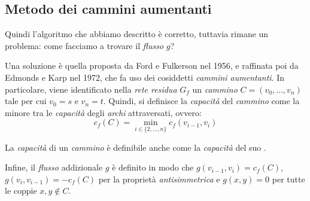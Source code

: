 \subsection{Metodo dei cammini aumentanti}
Quindi l'algoritmo che abbiamo descritto è corretto, tuttavia rimane un problema:
come facciamo a trovare il \emph{flusso} $g$?

Una soluzione è quella proposta da Ford e Fulkerson nel 1956, e raffinata poi
da Edmonds e Karp nel 1972, che fa uso dei cosiddetti \emph{cammini aumentanti}.
In particolare, viene identificato nella \emph{rete residua} $G_f$ un
\emph{cammino} $C=(v_0,\dots,v_n)$ tale per cui $v_0=s$ e $v_n=t$. Quindi, si
definisce la \emph{capacità} del \emph{cammino} come la minore tra le
\emph{capacità} degli \emph{archi} attraversati, ovvero:
\[c_f(C)=\min_{i\in\{2,\dots,n\}}c_f(v_{i-1},v_i)\]

\begin{note}
    La \emph{capacità} di un \emph{cammino} è definibile anche come la
    \emph{capacità} del suo .
\end{note}

\noindent
Infine, il \emph{flusso} addizionale $g$ è definito in modo che $g(v_{i-1},v_i)=
c_f(C)$, $g(v_i,v_{i-1})=-c_f(C)$ per la proprietà \emph{antisimmetrica} e
$g(x,y)=0$ per tutte le coppie $x,y\notin C$.

